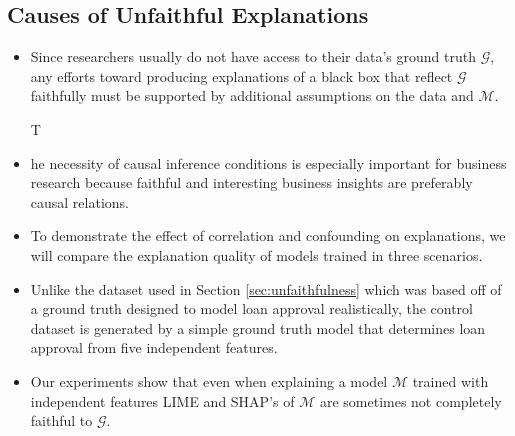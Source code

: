 \documentclass[mnsc,blindrev]{informs3}
\begin{document}
    \subsection{Causes of Unfaithful Explanations}
        \begin{itemize}
        \item Since researchers usually do not have access to their data's ground truth $\mathcal{G}$, any efforts toward producing explanations of a black box that reflect $\mathcal{G}$ faithfully must be supported by additional assumptions on the data and $\mathcal{M}$.

        T\item he necessity of causal inference conditions is especially important for business research because faithful and interesting business insights are preferably causal relations.

        
        \item To demonstrate the effect of correlation and confounding on explanations, we will compare the explanation quality of models trained in three scenarios. 
        
        \item Unlike the dataset used in Section \ref{sec:unfaithfulness} which was based off of a ground truth designed to model loan approval realistically, the control dataset is generated by a simple ground truth model that determines loan approval from five independent features.
        
        \item Our experiments show that even when explaining a model $\mathcal{M}$ trained with independent features
        LIME and SHAP's of $\mathcal{M}$ are sometimes not completely faithful to $\mathcal{G}$. 
        \end{itemize}
\end{document}
